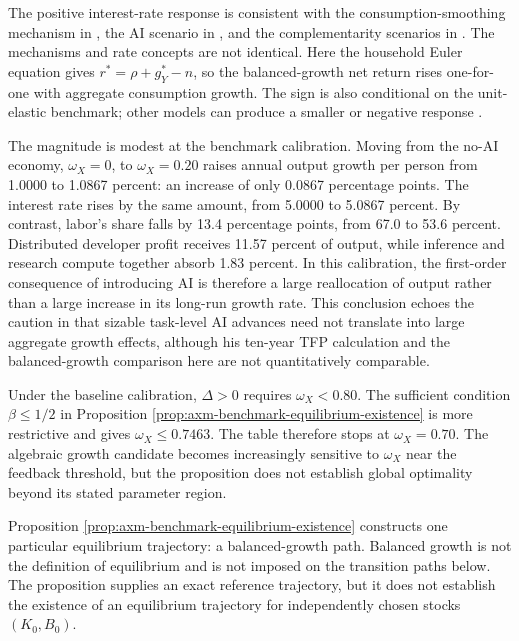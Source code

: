 The positive interest-rate response is consistent with the
consumption-smoothing mechanism in \citet{chowhalperinmazlish2026}, the AI
scenario in \citet{rachel2025}, and the complementarity scenarios in
\citet{melinavilla2025}. The mechanisms and rate concepts are not identical.
Here the household Euler equation gives \(r^*=\rho+g_Y^*-n\), so the
balanced-growth net return rises one-for-one with aggregate consumption growth.
The sign is also conditional on the unit-elastic benchmark; other models can
produce a smaller or negative response \citep{melinavilla2025,andrewsfarboodi2025}.

The magnitude is modest at the benchmark calibration. Moving from the no-AI
economy, \(\omega_X=0\), to \(\omega_X=0.20\) raises annual output growth per
person from 1.0000 to 1.0867 percent: an increase of only 0.0867 percentage
points. The interest rate rises by the same amount, from 5.0000 to 5.0867
percent. By contrast, labor's share falls by 13.4 percentage points, from 67.0
to 53.6 percent. Distributed developer profit receives 11.57 percent of output,
while inference and research compute together absorb 1.83 percent. In this
calibration, the first-order consequence of introducing AI is therefore a large
reallocation of output rather than a large increase in its long-run growth
rate. This conclusion echoes the caution in \citet{acemoglu2025} that sizable
task-level AI advances need not translate into large aggregate growth effects,
although his ten-year TFP calculation and the balanced-growth comparison here
are not quantitatively comparable.

Under the baseline calibration, \(\Delta>0\) requires \(\omega_X<0.80\).
The sufficient condition \(\beta\leq1/2\) in Proposition
\ref{prop:axm-benchmark-equilibrium-existence} is more restrictive and gives
\(\omega_X\leq0.7463\). The table therefore stops at \(\omega_X=0.70\).
The algebraic growth candidate becomes increasingly sensitive to
\(\omega_X\) near the feedback threshold, but the proposition does not
establish global optimality beyond its stated parameter region.

Proposition \ref{prop:axm-benchmark-equilibrium-existence} constructs one
particular equilibrium trajectory: a balanced-growth path. Balanced growth is
not the definition of equilibrium and is not imposed on the transition paths
below. The proposition supplies an exact reference trajectory, but it does not
establish the existence of an equilibrium trajectory for independently chosen
stocks \((K_0,B_0)\).

